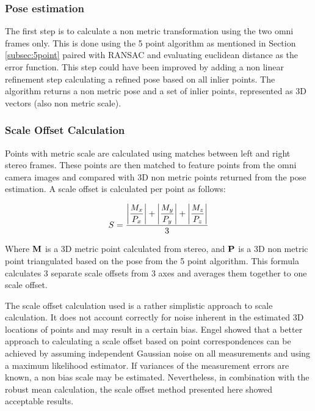 \subsubsection{Pose estimation}

The first step is to calculate a non metric transformation using the two omni frames only.  This is done using the 5 point algorithm as mentioned in Section \ref{subsec:5point} paired with RANSAC and evaluating euclidean distance as the error function.  This step could have been improved by adding a non linear refinement step calculating a refined pose based on all inlier points.  The algorithm returns a non metric pose and a set of inlier points, represented as 3D vectors (also non metric scale).

\subsubsection{Scale Offset Calculation}

Points with metric scale are calculated using matches between left and right stereo frames.  These points are then matched to feature points from the omni camera images and compared with 3D non metric points returned from the pose estimation.  A scale offset is calculated per point as follows:

\begin{align}
  \centering
   S =
   \displaystyle\frac{
   \left|\displaystyle\frac{ {M}_{x}}{ P_{x}}\right| + 
   \left|\displaystyle\frac{ {M}_{y}}{ P_{y}}\right| + 
   \left|\displaystyle\frac{ {M}_{z}}{ P_{z}}\right|
   }
   {3}
  \label{eq:scale_offset}
\end{align}

Where $\mathbf{M}$ is a 3D metric point calculated from stereo, and $\mathbf{P}$ is a 3D non metric point triangulated based on the pose from the 5 point algorithm.  This formula calculates 3 separate scale offsets from 3 axes and averages them together to one scale offset. 

The scale offset calculation used is a rather simplistic approach to scale calculation.  It does not account correctly for noise inherent in the estimated 3D locations of points and may result in a certain bias. Engel\cite{engel_11} showed that a better approach to calculating a scale offset based on point correspondences can be achieved by assuming independent Gaussian noise on all measurements and using a maximum likelihood estimator. If variances of the measurement errors are known, a non bias scale may be estimated. Nevertheless, in combination with the robust mean calculation, the scale offset method presented here showed acceptable results.

